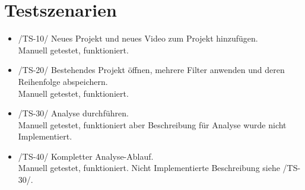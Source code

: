 \chapter{Testszenarien}
\begin{itemize}
\item /TS-10/ Neues Projekt und neues Video zum Projekt hinzufügen.\\
Manuell getestet, funktioniert.

\item /TS-20/ Bestehendes Projekt öffnen, mehrere Filter anwenden und deren Reihenfolge abspeichern.\\
Manuell getestet, funktioniert.

\item /TS-30/ Analyse durchführen.\\
Manuell getestet, funktioniert aber Beschreibung für Analyse wurde nicht Implementiert.

\item /TS-40/ Kompletter Analyse-Ablauf.\\
Manuell getestet, funktioniert. Nicht Implementierte Beschreibung siehe /TS-30/.

\end{itemize}
